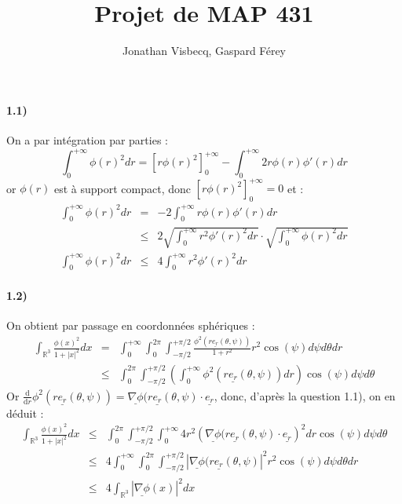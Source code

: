 \documentclass[12pt,a4paper,titlepage]{article}
\author{Jonathan Visbecq, Gaspard Férey}
\title{Projet de MAP 431}
\newcommand{\R}{\mathbb{R}}
\newcommand{\vect}[1]{\underline{#1}}
\begin{document}
\maketitle

\paragraph{1.1)} On a par intégration par parties :
$$ \int_0^{+\infty} \phi(r)^2 dr = \left[ r \phi(r)^2 \right]_{0}^{+\infty} - \int_0^{+\infty} 2 r \phi(r) \phi'(r) dr $$
or $\phi(r)$ est à support compact, donc $\left[ r \phi(r)^2 \right]_{0}^{+\infty} = 0$ et :
\begin{eqnarray*}
\int_0^{+\infty} \phi(r)^2 dr &=& - 2 \int_0^{+\infty} r \phi(r) \phi'(r) dr \\
&\leq & 2 \sqrt{ \int_0^{+\infty} r^2 \phi'(r)^2 dr } \cdot \sqrt{ \int_0^{+\infty} \phi(r)^2 dr } \\
\int_0^{+\infty} \phi(r)^2 dr &\leq & 4 \int_0^{+\infty} r^2 \phi'(r)^2 dr
\end{eqnarray*}


\paragraph{1.2)} On obtient par passage en coordonnées sphériques :
\begin{eqnarray*}
\int_{\R^3}  \frac{ \phi(x)^2 }{1+|x|^2} dx &=& \int_0^{+\infty} \int_0^{2\pi} \int_{-\pi /2}^{+\pi /2} \frac{\phi^2(r \vect{e_r}(\theta, \psi))}{1+r^2} r^2 \cos(\psi) d\psi d\theta dr \\
&\leq & \int_0^{2\pi} \int_{-\pi /2}^{+\pi /2} \left( \int_0^{+\infty} \phi^2(r \vect{e_r}(\theta, \psi)) dr \right) \cos(\psi) d\psi d\theta
\end{eqnarray*}
Or $ \frac{\text{d}}{\text{d}r} \phi^2(r \vect{e_r}(\theta, \psi)) = \vect{\nabla \phi} (r \vect{e_r}(\theta, \psi) \cdot \vect{e_r} $, donc, d'après la question 1.1), on en déduit :
\begin{eqnarray*}
\int_{\R^3}  \frac{ \phi(x)^2 }{1+|x|^2} dx &\leq & \int_0^{2\pi} \int_{-\pi /2}^{+\pi /2} \int_0^{+\infty} 4 r^2 \left( \vect{\nabla \phi} (r \vect{e_r}(\theta, \psi) \cdot \vect{e_r} \right)^2 dr \cos(\psi) d\psi d\theta \\
&\leq & 4 \int_0^{+\infty} \int_0^{2\pi} \int_{-\pi /2}^{+\pi /2}  | \vect{\nabla \phi}(r \vect{e_r}(\theta, \psi) |^2 r^2 \cos(\psi) d\psi d\theta dr \\
&\leq & 4 \int_{\R^3} | \vect{\nabla \phi}(x) |^2 dx
\end{eqnarray*}
\end{document}
